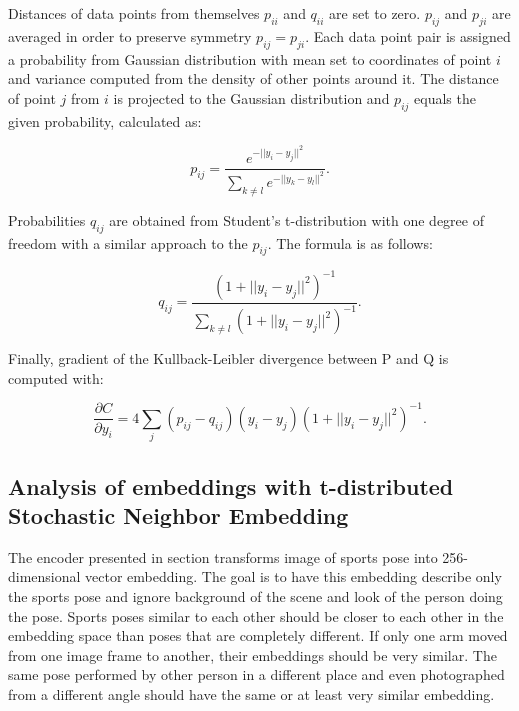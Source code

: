 Distances of data points from themselves $p_{i i}$ and $q_{i i}$ are set to zero. $p_{i j}$ and $p_{j i}$ are averaged in order to preserve symmetry $p_{i j} = p_{j i}$. Each data point pair is assigned a probability from Gaussian distribution with mean set to coordinates of point $i$ and variance computed from the density of other points around it. The distance of point $j$ from $i$ is projected to the Gaussian distribution and $p_{i j}$ equals the given probability, calculated as:

\begin{equation}
    \label{eq:tsne-p}
    p_{i j} = \frac{e^{-|| {y}_{i} - {y}_{j} ||^2}}{\sum \limits_{k \neq l} e^{-|| {y}_{k} - {y}_{l} ||^2}}.
\end{equation}

\noindent Probabilities $q_{i j}$ are obtained from Student's t-distribution with one degree of freedom with a similar approach to the $p_{i j}$. The formula is as follows:

\begin{equation}
    \label{eq:tsne-q}
    q_{i j} = \frac{(1 + || {y}_{i} - {y}_{j} ||^2)^{-1}}{\sum \limits_{k \neq l} (1 + || {y}_{i} - {y}_{j} ||^2)^{-1}}.
\end{equation}

\noindent Finally, gradient of the Kullback-Leibler divergence between P and Q is computed with:

\begin{equation}
    \label{eq:tsne-gradient}
    \frac{\partial C}{\partial y_{i}} = 4 \sum \limits_{j} (p_{i j} - q_{i j}) (y_{i} - y_{j}) (1 + || {y}_{i} - {y}_{j} ||^2)^{-1}.
\end{equation}

\subsection{Analysis of embeddings with t-distributed Stochastic Neighbor Embedding}

The encoder presented in section  transforms image of sports pose into 256-dimensional vector embedding. The goal is to have this embedding describe only the sports pose and ignore background of the scene and look of the person doing the pose. Sports poses similar to each other should be closer to each other in the embedding space than poses that are completely different. If only one arm moved from one image frame to another, their embeddings should be very similar. The same pose performed by other person in a different place and even photographed from a different angle should have the same or at least very similar embedding.


